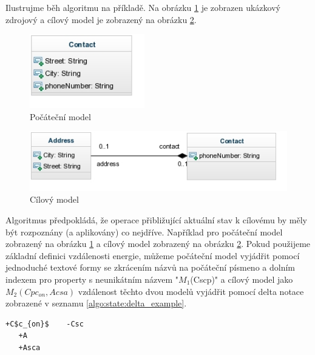 \documentclass[11pt,twoside,a4paper]{book}
\begin{document}
Ilustrujme běh algoritmu na příkladě. Na obrázku \ref{fig:exp_contact} je
zobrazen ukázkový zdrojový a cílový model je zobrazený na obrázku
\ref{fig:exp_contact_address}.

\begin{figure}[H]
\begin{center}
\includegraphics[width=5cm]{figures/exp_contact.jpg}
\caption{Počáteční model}
\label{fig:exp_contact}
\end{center}
\end{figure}

\begin{figure}[H]
\begin{center}
\includegraphics[width=12cm]{figures/exp_contact_address.jpg}
\caption{Cílový model}
\label{fig:exp_contact_address}
\end{center}
\end{figure}

\FloatBarrier

Algoritmus předpokládá, že operace přibližující aktuální stav k cílovému by
měly být rozpoznány (a aplikovány) co nejdříve. Například pro počáteční model
zobrazený na obrázku \ref{fig:exp_contact} a cílový model zobrazený na obrázku
\ref{fig:exp_contact_address}. 
Pokud použijeme základní definici vzdálenosti energie, můžeme
počáteční model vyjádřit pomocí jednoduché textové formy se
zkrácením názvů na počáteční písmeno a dolním indexem pro
property s neunikátním názvem "$M_1$(Cscp)" a cílový model jako $M_2(Cpc_{on},
Acsa)$ vzdálenost těchto dvou modelů vyjádřit pomocí
 delta notace zobrazené v seznamu \ref{algo:state:delta_example}.
 
\begin{lstlisting}[mathescape,frame=single,caption=Textový patch
modelů pro ukázkový příklad v delta notaci,label=algo:state:delta_example]
   +C$c_{on}$    -Csc
   +A            
   +Asca
\end{lstlisting}
\end{document}
